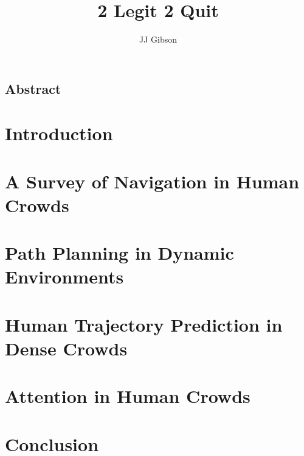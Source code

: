 \documentclass[twoside,10pt]{report}
\newcommand{\clearemptydoublepage}{\newpage{\pagestyle{empty}\cleardoublepage}}
\begin{document}
\title{2 Legit 2 Quit}
\author{JJ Gibson}



\clearpage


\clearemptydoublepage
\setcounter{page}{1}

\begin{centering} \section*{Abstract} \end{centering}


\tableofcontents
\clearpage


\setcounter{page}{1}


\chapter{Introduction}
\label{chap:introduction}


\clearpage

\chapter{A Survey of Navigation in Human Crowds}
\label{chap:survey}


\clearpage

\chapter{Path Planning in Dynamic Environments}
\label{chap:ppad}


\clearpage

\chapter{Human Trajectory Prediction in Dense Crowds}
\label{chap:oigp}


\clearpage

\chapter{Attention in Human Crowds}
\label{chap:attn}


\clearpage

\chapter{Conclusion}
\label{chap:conclusion}


 
{\small }
\end{document}
